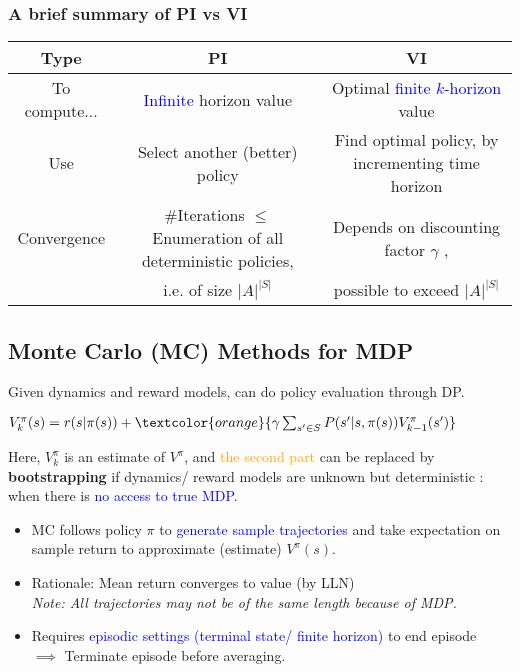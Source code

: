\documentclass{article}
\begin{document}
\subsubsection*{A brief summary of PI vs VI}
\begin{center}
    \begin{tabular}{|c||c|c|}
    \hline
     Type & PI & VI \\ \hline
     To compute... & 
        \textcolor{blue}{Infinite} horizon value &
        Optimal \textcolor{blue}{finite $k$-horizon} value 
    \\ \hline
    Use & 
        Select another (better) policy &
        Find optimal policy, by incrementing time horizon 
    \\ \hline
        Convergence & 
        \#Iterations $\leq$ Enumeration of all deterministic policies, &
        Depends on discounting factor $\gamma$ , 
    \\ & i.e. of size $|A|^{|S|}$ & possible to exceed $|A|^{|S|}$
    \\ \hline
    \end{tabular}
\end{center}

\subsection{Monte Carlo (MC) Methods for MDP}
Given dynamics and reward models, can do policy evaluation through DP.
\begin{center}
    $V_k^{\pi}(s) = r (s | \pi(s)) + \textcolor{orange}{\gamma \sum_{s' \in S} P(s' | s, \pi(s)) V_{k-1}^{\pi}(s')}$
\end{center}

Here, $V_k^{\pi}$ is an estimate of $V^{\pi}$, and \textcolor{orange}{the second part} can be replaced by \textbf{bootstrapping} if dynamics/ reward models are unknown but deterministic 
: when there is \textcolor{blue}{no access to true MDP}.
\begin{itemize}
\item MC follows policy $\pi$ to \textcolor{blue}{generate sample trajectories} and take expectation on sample return to approximate (estimate) $V^{\pi}(s)$.
\item Rationale: Mean return converges to value (by LLN)
    \\\textit{Note: All trajectories may not be of the same length because of MDP.}
\item Requires \textcolor{blue}{episodic settings (terminal state/ finite horizon)} to end episode
    \\ $\implies$ Terminate episode before averaging.
\end{itemize}
\end{document}
